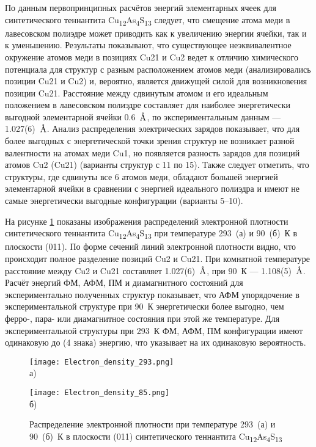 По данным первопринципных расчётов энергий элементарных ячеек для синтетического теннантита Cu\textsubscript{12}As\textsubscript{4}S\textsubscript{13} следует,  что смещение атома меди в лавесовском полиэдре может приводить как к увеличению энергии ячейки, так и к уменьшению.
Результаты показывают, что существующее неэквивалентное  окружение атомов меди в позициях Cu21 и Cu2 ведет к отличию химического потенциала для структур с разным расположением атомов меди (анализировались позиции Cu21 и Cu2) и, вероятно, является движущей силой для возникновения позиции Cu21. Расстояние между сдвинутым атомом и его идеальным положением в лавесовском полиэдре составляет для наиболее энергетически выгодной элементарной ячейки 0.6~$\mbox{\normalfont\AA}$, по экспериментальным данным --- 1.027(6)~$\mbox{\normalfont\AA}$.
Анализ распределения электрических зарядов показывает, что для более выгодных с энергетической точки зрения структур не возникает разной валентности на атомах меди Cu1,
но появляется разность зарядов для позиций атомов Cu2 (Cu21) (варианты структур с 11 по 15). Также следует отметить, что структуры, где сдвинуты все 6 атомов меди, обладают большей энергией элементарной ячейки в сравнении с энергией идеального полиэдра и имеют не самые энергетически выгодные конфигурации  (варианты 5--10).

На рисунке \ref{img:xray2} показаны изображения распределений электронной плотности синтетического теннантита Cu\textsubscript{12}As\textsubscript{4}S\textsubscript{13} при температуре 293~(а) и 90~(б)~К в плоскости (011).
По форме сечений линий электронной плотности видно, что происходит полное разделение позиций Cu2 и Cu21.
При комнатной температуре расстояние между Cu2 и Cu21 составляет 1.027(6)~$\mbox{\normalfont\AA}$, при 90~К --- 1.108(5)~$\mbox{\normalfont\AA}$.
Расчёт энергий ФМ, АФМ, ПМ и диамагнитного состояний для экспериментально полученных структур показывает, что АФМ упорядочение в экспериментальной структуре при 90~К энергетически более выгодно, чем ферро-, пара- или диамагнитное состояния при этой же температуре.
Для экспериментальной структуры при 293~К ФМ, АФМ, ПМ конфигурации имеют одинаковую до (4 знака) энергию, что указывает на их одинаковую вероятность.

\begin{figure}[hb]
  \begin{minipage}[ht]{0.5\linewidth}\centering
    \texttt{[image: Electron\_density\_293.png]} \\ а)
  \end{minipage}
  \hfill
  \begin{minipage}[ht]{0.5\linewidth}\centering
    \texttt{[image: Electron\_density\_85.png]} \\ б)
  \end{minipage}

      \caption[Распределение электронной плотности при температуре 293~(а) и 90~(б)~К в плоскости (011) синтетического теннантита Cu\textsubscript{12}As\textsubscript{4}S\textsubscript{13}]{Распределение электронной плотности при температуре 293~(а) и 90~(б)~К в плоскости (011) синтетического теннантита Cu\textsubscript{12}As\textsubscript{4}S\textsubscript{13}}
    \label{img:xray2}
\end{figure}

